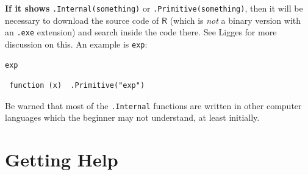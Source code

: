 \documentclass[captions=tableheading]{scrbook}
\begin{document}
\textbf{If it shows} \texttt{.Internal(something)} or \texttt{.Primitive(something)}, then it will be necessary to download the source code of \(\mathsf{R}\) (which is \emph{not} a binary version with an \texttt{.exe} extension) and search inside the code there. See Ligges \cite{Ligges2006} for more discussion on this. An example is \texttt{exp}:


\begin{verbatim}
exp
\end{verbatim}

\begin{verbatim}
 function (x)  .Primitive("exp")
\end{verbatim}

Be warned that most of the \texttt{.Internal} functions are written in other computer languages which the beginner may not understand, at least initially.
\section{Getting Help}
\label{sec-2-4}
\label{sec-Getting-Help}
\end{document}
